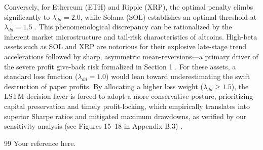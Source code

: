 \documentclass{article}
\begin{document}
Conversely, for Ethereum (ETH) and Ripple (XRP), the optimal penalty climbs significantly to $\lambda_{dd} = 2.0$, while Solana (SOL) establishes an optimal threshold at $\lambda_{dd} = 1.5$ \cite{source1}. This phenomenological discrepancy can be rationalized by the inherent market microstructure and tail-risk characteristics of altcoins. High-beta assets such as SOL and XRP are notorious for their explosive late-stage trend accelerations followed by sharp, asymmetric mean-reversions—a primary driver of the severe profit give-back risk formalized in Section 1 \cite{source1}. For these assets, a standard loss function ($\lambda_{dd}=1.0$) would lean toward underestimating the swift destruction of paper profits. By allocating a higher loss weight ($\lambda_{dd} \ge 1.5$), the LSTM decision layer is forced to adopt a more conservative posture, prioritizing capital preservation and timely profit-locking, which empirically translates into superior Sharpe ratios and mitigated maximum drawdowns, as verified by our sensitivity analysis (see Figures 15–18 in Appendix B.3) \cite{source1}.

\begin{thebibliography}{99}
 Your reference here.
\end{thebibliography}
\end{document}
